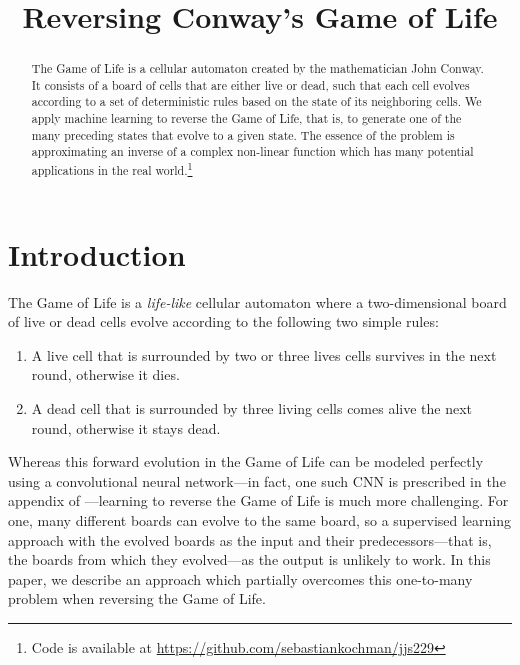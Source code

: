 \documentclass[conference]{IEEEtran}
\begin{document}
\title{Reversing Conway's Game of Life}

\author{
\and
{}
\and
{}
}

\maketitle
\thispagestyle{plain}
\pagestyle{plain}

\begin{abstract}
The Game of Life \cite{wiki:GameOfLife} is a cellular automaton created by the mathematician John Conway. It consists of a board of cells that are either live or dead, such that each cell evolves according to a set of deterministic rules  based on the state of its neighboring cells. We apply machine learning to reverse the Game of Life, that is, to generate one of the many preceding states that evolve to a given state. The essence of the problem is approximating an inverse of a complex non-linear function which has many potential applications in the real world.\footnote{Code is available at \url{https://github.com/sebastiankochman/jjs229}}
\end{abstract}

\section{Introduction}
\label{intro}
The Game of Life is a \emph{life-like} cellular automaton \cite{wiki:LifeLikeAutomaton} where a two-dimensional board of live or dead cells evolve according to the following two simple rules:
\begin{enumerate}
    \item A live cell that is surrounded by two or three lives cells survives in the next round, otherwise it dies.
    \item A dead cell that is surrounded by three living cells comes alive the next round, otherwise it stays dead.
\end{enumerate}
Whereas this forward evolution in the Game of Life can be modeled perfectly using a convolutional neural network---in fact, one such CNN is prescribed in the appendix of  \cite{springer2020its}---learning to reverse the Game of Life is much more challenging. For one, many different boards can evolve to the same board, so a supervised learning approach with the evolved boards as the input and their predecessors---that is, the boards from which they evolved---as the output is unlikely to work. In this paper, we describe an approach which partially overcomes this one-to-many problem when reversing the Game of Life.
\end{document}
